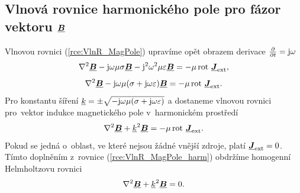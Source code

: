 \subsection*{Vlnová rovnice harmonického pole pro fázor vektoru $\mbox{\underline{\boldmath$B$}}$}
Vlnovou rovnici (\ref{rce:VlnR_MagPole}) upravíme opět obrazem derivace $\frac{\partial}{\partial t}=\mathrm{j}\omega$
\begin{displaymath}
	\nabla^{2}\mbox{\underline{\boldmath$B$}} - \mathrm{j}\omega\mu\sigma\mbox{\underline{\boldmath$B$}} - \mathrm{j}^{2}\omega^{2}\mu\varepsilon\mbox{\underline{\boldmath$B$}} = -\mu\,\mathrm{rot}\ \mbox{\underline{\boldmath$J$}}_{\mathrm{ext}},
\end{displaymath}
\begin{displaymath}
	\nabla^{2}\mbox{\underline{\boldmath$B$}} - \mathrm{j}\omega\mu(\sigma + \mathrm{j}\omega\varepsilon)\mbox{\underline{\boldmath$B$}} = -\mu\,\mathrm{rot}\ \mbox{\underline{\boldmath$J$}}_{\mathrm{ext}}.
\end{displaymath}
Pro konstantu šíření ${\underline{k}}=\pm\sqrt{-\mathrm{j}\omega\mu(\sigma+\mathrm{j}\omega\varepsilon)}$ a dostaneme vlnovou rovnici pro~vektor indukce magnetického pole v~harmonickém prostředí
\begin{equation}
	\nabla^{2}\mbox{\underline{\boldmath$B$}} +{\underline{k}}^{2}\mbox{\underline{\boldmath$B$}} = -\mu\,\mathrm{rot}\ \mbox{\underline{\boldmath$J$}}_{\mathrm{ext}}.
	\label{rce:VlnR_MagPole_harm} 
\end{equation}
Pokud se jedná o~oblast, ve které nejsou žádné vnější zdroje, platí $\mbox{\underline{\boldmath$J$}}_{\mathrm{ext}} = 0$. Tímto doplněním z~rovnice  (\ref{rce:VlnR_MagPole_harm}) obdržíme homogenní Helmholtzovu rovnici
\begin{equation}
	\nabla^{2}\mbox{\underline{\boldmath$B$}} +{\underline{k}}^{2}\mbox{\underline{\boldmath$B$}} = 0.
	\label{rce:VlnR_MagPole_harm_BezZdroju} 
\end{equation}


